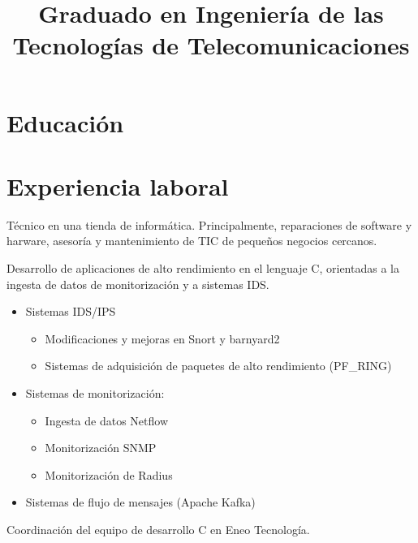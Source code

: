 \documentclass[11pt,a4paper,sans]{moderncv}
\title{Graduado en Ingeniería de las Tecnologías de Telecomunicaciones}               %
\begin{document}
\maketitle

\section{Educación}



\section{Experiencia laboral}
{Técnico en una tienda de informática. Principalmente, reparaciones de software y harware,
asesoría y mantenimiento de TIC de pequeños negocios cercanos.\newline{}}
{Desarrollo de aplicaciones de alto rendimiento en el lenguaje C, orientadas a la
ingesta de datos de monitorización y a sistemas IDS.\newline
\begin{itemize}%
  \item Sistemas IDS/IPS
  \begin{itemize}
    \item Modificaciones y mejoras en Snort y barnyard2
    \item Sistemas de adquisición de paquetes de alto rendimiento (PF\_RING)
  \end{itemize}
  \item Sistemas de monitorización:
  \begin{itemize}
    \item Ingesta de datos Netflow
    \item Monitorización SNMP
    \item Monitorización de Radius
  \end{itemize}
  \item Sistemas de flujo de mensajes (Apache Kafka)
\end{itemize}}
{Coordinación del equipo de desarrollo C en Eneo Tecnología.}
\end{document}
